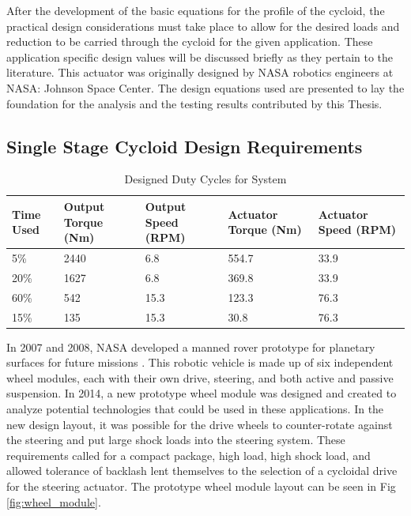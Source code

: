 After the development of the basic equations for the profile of the cycloid, the practical design considerations must take place to allow for the desired loads and reduction to be carried through the cycloid for the given application. These application specific design values will be discussed briefly as they pertain to the literature. This actuator was originally designed by NASA robotics engineers at NASA: Johnson Space Center. The design equations used are presented to lay the foundation for the analysis and the testing results contributed by this Thesis.

\subsection{Single Stage Cycloid Design Requirements}

\begin{table}[!b]
  \vskip0.2cm
  \caption{Designed Duty Cycles for System}
  \label{duty_cycle}
  \begin{center}
    \vskip-0.2cm
    \begin{tabular}{|p{}||p{}||p{}| |p{}| |p{}|}
    \hline
    Time Used & Output Torque (Nm) & Output Speed (RPM) & Actuator Torque (Nm) & Actuator Speed (RPM)\\
    \hline
    5\% & 2440 & 6.8 & 554.7 & 33.9\\
    \hline
    20\% & 1627 & 6.8 & 369.8 & 33.9\\
    \hline
    60\% & 542 & 15.3 & 123.3 & 76.3\\
    \hline
    15\% & 135 & 15.3 & 30.8 & 76.3\\
    \hline
    \end{tabular}
  \end{center}
\end{table}

In 2007 and 2008, NASA developed a manned rover prototype for planetary surfaces for future missions \cite{ref:rover}.
This robotic vehicle is made up of six independent wheel modules, each with their own drive, steering, and both active and passive suspension.
In 2014, a new prototype wheel module was designed and created to analyze potential technologies that could be used in these applications.
In the new design layout, it was possible for the drive wheels to counter-rotate against the steering and put large shock loads into the steering system.
These requirements called for a compact package, high load, high shock load, and allowed tolerance of backlash lent themselves to the selection of a cycloidal drive for the steering actuator.
The prototype wheel module layout can be seen in Fig \ref{fig:wheel_module}.

